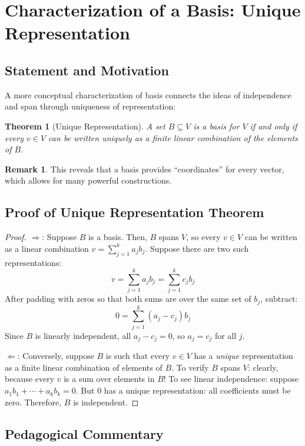 \documentclass[11pt]{article}
\theoremstyle{definition}
\newtheorem{remark}[definition]{Remark}
\theoremstyle{plain}
\newtheorem{theorem}[definition]{Theorem}
\begin{document}
\section{Characterization of a Basis: Unique Representation}

\subsection{Statement and Motivation}

A more conceptual characterization of basis connects the ideas of independence and span through uniqueness of representation:

\begin{theorem}[Unique Representation]
A set $B \subseteq V$ is a basis for $V$ if and only if every $v \in V$ can be written uniquely as a \emph{finite} linear combination of the elements of $B$.
\end{theorem}

\begin{remark}
This reveals that a basis provides ``coordinates'' for every vector, which allows for many powerful constructions.
\end{remark}

\subsection{Proof of Unique Representation Theorem}

\begin{proof}
$\Rightarrow$: Suppose $B$ is a basis. Then, $B$ spans $V$, so every $v \in V$ can be written as a linear combination $v = \sum_{j=1}^k a_j b_j$. Suppose there are two such representations:
\[
v = \sum_{j=1}^k a_j b_j = \sum_{j=1}^k c_j b_j
\]
After padding with zeros so that both sums are over the same set of $b_j$, subtract:
\[
0 = \sum_{j=1}^k (a_j - c_j) b_j
\]
Since $B$ is linearly independent, all $a_j - c_j = 0$, so $a_j = c_j$ for all $j$.

$\Leftarrow$: Conversely, suppose $B$ is such that every $v \in V$ has a \emph{unique} representation as a finite linear combination of elements of $B$. To verify $B$ spans $V$: clearly, because every $v$ is a sum over elements in $B$! To see linear independence: suppose $a_1 b_1 + \cdots + a_k b_k = 0$. But $0$ has a unique representation: all coefficients must be zero. Therefore, $B$ is independent.
\end{proof}

\subsection{Pedagogical Commentary}
\end{document}
